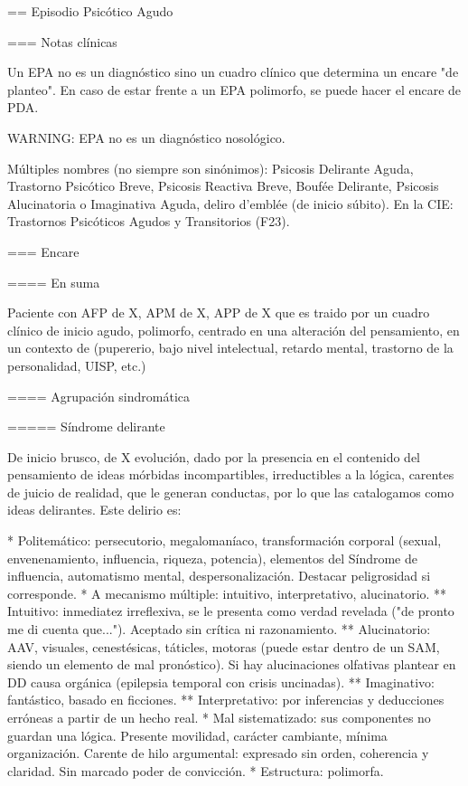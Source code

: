 == Episodio Psicótico Agudo

=== Notas clínicas

Un EPA no es un diagnóstico sino un cuadro clínico que determina un encare "de planteo". En caso de estar frente a un EPA polimorfo, se puede hacer el encare de PDA.

WARNING: EPA no es un diagnóstico nosológico.

Múltiples nombres (no siempre son sinónimos): Psicosis Delirante Aguda, Trastorno Psicótico Breve, Psicosis Reactiva Breve, Boufée Delirante, Psicosis Alucinatoria o Imaginativa Aguda, deliro d'emblée (de inicio súbito). En la CIE: Trastornos Psicóticos Agudos y Transitorios (F23).

=== Encare

==== En suma

Paciente con AFP de X, APM de X, APP de X que es traido por un cuadro clínico de inicio agudo, polimorfo, centrado en una alteración del pensamiento, en un contexto de (pupererio, bajo nivel intelectual, retardo mental, trastorno de la personalidad, UISP, etc.)

==== Agrupación sindromática

===== Síndrome delirante

De inicio brusco, de X evolución, dado por la presencia en el contenido del pensamiento de ideas mórbidas incompartibles, irreductibles a la lógica, carentes de juicio de realidad, que le generan conductas, por lo que las catalogamos como ideas delirantes. Este delirio es:

* Politemático: persecutorio, megalomaníaco, transformación corporal (sexual, envenenamiento, influencia, riqueza, potencia), elementos del Síndrome de influencia, automatismo mental, despersonalización. Destacar peligrosidad si corresponde.
* A mecanismo múltiple: intuitivo, interpretativo, alucinatorio.
** Intuitivo: inmediatez irreflexiva, se le presenta como verdad revelada ("de pronto me di cuenta que..."). Aceptado sin crítica ni razonamiento.
** Alucinatorio: AAV, visuales, cenestésicas, táticles, motoras (puede estar dentro de un SAM, siendo un elemento de mal pronóstico). Si hay alucinaciones olfativas plantear en DD causa orgánica (epilepsia temporal con crisis uncinadas).
** Imaginativo: fantástico, basado en ficciones.
** Interpretativo: por inferencias y deducciones erróneas a partir de un hecho real.
* Mal sistematizado: sus componentes no guardan una lógica. Presente movilidad, carácter cambiante, mínima organización. Carente de hilo argumental: expresado sin orden, coherencia y claridad. Sin marcado poder de convicción.
* Estructura: polimorfa.

